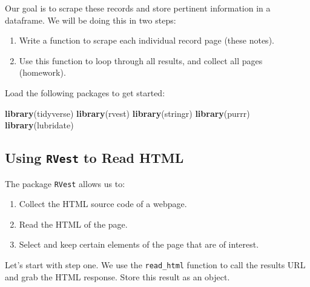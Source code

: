 \documentclass[]{book}
\newenvironment{Shaded}{\begin{snugshade}}{\end{snugshade}}
\newcommand{\KeywordTok}[1]{\textcolor[rgb]{0.13,0.29,0.53}{\textbf{#1}}}
\newcommand{\NormalTok}[1]{#1}
\providecommand{\tightlist}{%
  \setlength{\itemsep}{0pt}\setlength{\parskip}{0pt}}
\begin{document}
Our goal is to scrape these records and store pertinent information in a
dataframe. We will be doing this in two steps:

\begin{enumerate}
\def\labelenumi{\arabic{enumi}.}
\tightlist
\item
  Write a function to scrape each individual record page (these notes).
\item
  Use this function to loop through all results, and collect all pages
  (homework).
\end{enumerate}

Load the following packages to get started:

\begin{Shaded}
\begin{Highlighting}[]
\KeywordTok{library}\NormalTok{(tidyverse)}
\KeywordTok{library}\NormalTok{(rvest)}
\KeywordTok{library}\NormalTok{(stringr)}
\KeywordTok{library}\NormalTok{(purrr)}
\KeywordTok{library}\NormalTok{(lubridate)}
\end{Highlighting}
\end{Shaded}

\subsection{\texorpdfstring{Using \texttt{RVest} to Read
HTML}{Using RVest to Read HTML}}\label{using-rvest-to-read-html}

The package \texttt{RVest} allows us to:

\begin{enumerate}
\def\labelenumi{\arabic{enumi}.}
\tightlist
\item
  Collect the HTML source code of a webpage.
\item
  Read the HTML of the page.
\item
  Select and keep certain elements of the page that are of interest.
\end{enumerate}

Let's start with step one. We use the \texttt{read\_html} function to
call the results URL and grab the HTML response. Store this result as an
object.
\end{document}
